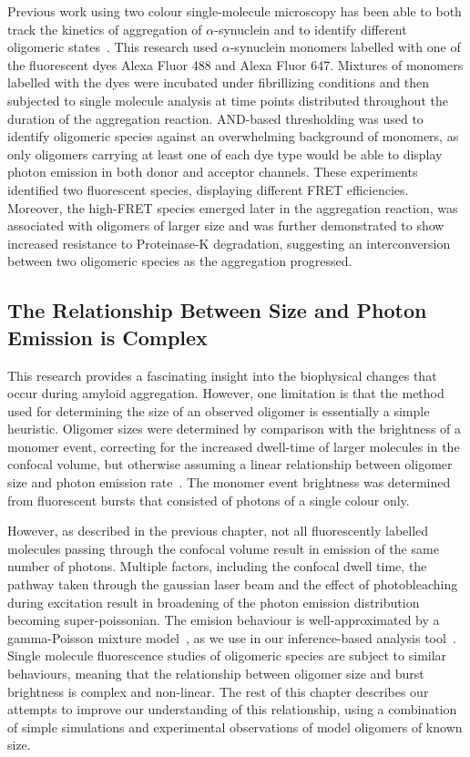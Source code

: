 Previous work using two colour single-molecule microscopy has been able to both track the kinetics of aggregation of $\alpha$-synuclein and to identify different oligomeric states~\cite{cremades2012}. This research used $\alpha$-synuclein monomers labelled with one of the fluorescent dyes Alexa Fluor 488 and Alexa Fluor 647. Mixtures of monomers labelled with the dyes were incubated under fibrillizing conditions and then subjected to single molecule analysis at time points distributed throughout the duration of the aggregation reaction. AND-based thresholding was used to identify oligomeric species against an overwhelming background of monomers, as only oligomers carrying at least one of each dye type would be able to display photon emission in both donor and acceptor channels. These experiments identified two fluorescent species, displaying different FRET efficiencies. Moreover, the high-FRET species emerged later in the aggregation reaction, was associated with oligomers of larger size and was further demonstrated to show increased resistance to Proteinase-K degradation, suggesting an interconversion between two oligomeric species as the aggregation progressed.

\subsection{The Relationship Between Size and Photon Emission is Complex}


This research provides a fascinating insight into the biophysical changes that occur during amyloid aggregation. However, one limitation is that the method used for determining the size of an observed oligomer is essentially a simple heuristic. Oligomer sizes were determined by comparison with the brightness of a monomer event, correcting for the increased dwell-time of larger molecules in the confocal volume, but otherwise assuming a linear relationship between oligomer size and photon emission rate~\cite{orte08}. The monomer event brightness was determined from fluorescent bursts that consisted of photons of a single colour only.

However, as described in the previous chapter, not all fluorescently labelled molecules passing through the confocal volume result in emission of the same number of photons. Multiple factors, including the confocal dwell time, the pathway taken through the gaussian laser beam and the effect of photobleaching during excitation result in broadening of the photon emission distribution becoming super-poissonian. The emision behaviour is well-approximated by a gamma-Poisson mixture model~\cite{chen1999}, as we use in our inference-based analysis tool~\cite{murphy14}. Single molecule fluorescence studies of oligomeric species are subject to similar behaviours, meaning that the relationship between oligomer size and burst brightness is complex and non-linear. The rest of this chapter describes our attempts to improve our understanding of this relationship, using a combination of simple simulations and experimental observations of model oligomers of known size. 

